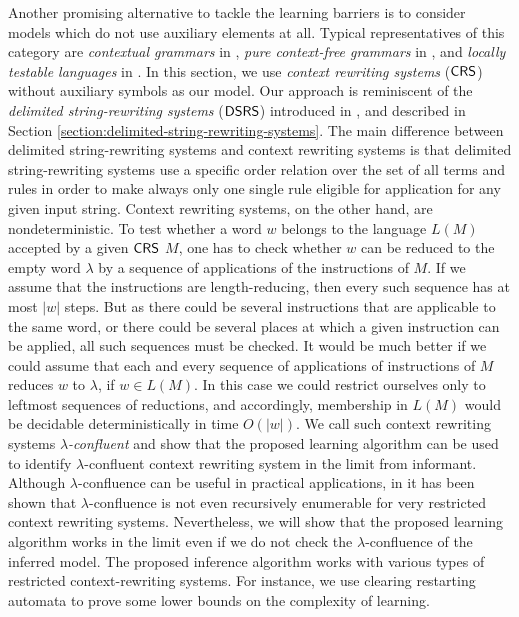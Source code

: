 Another promising alternative to tackle the learning barriers is to consider models which do not use auxiliary elements at all. Typical representatives of this category are \emph{contextual grammars} in \citep{M69}, \emph{pure context-free grammars} in \citep{maurer1980pure}, and \emph{locally testable languages} in \citep{MR74,Zal72}. In this section, we use \emph{context rewriting systems} ($\textup{\sf CRS\/}$) without auxiliary symbols as our model. Our approach is reminiscent of the \emph{delimited string-rewriting systems} ($\textup{\sf DSRS}$) introduced in \citep{Eyraud2007}, and described in Section \ref{section:delimited-string-rewriting-systems}. The main difference between delimited string-rewriting systems and context rewriting systems is that delimited string-rewriting systems use a specific order relation over the set of all terms and rules in order to make always only one single rule eligible for application for any given input string. Context rewriting systems, on the other hand, are nondeterministic. To test whether a word $w$ belongs to the language $L(M)$ accepted by a given $\textup{\sf CRS\/}$ $M$, one has to check whether $w$ can be reduced to the empty word $\lambda$ by a sequence of applications of the instructions of $M$. If we assume that the instructions are length-reducing, then every such sequence has at most $|w|$ steps. But as there could be several instructions that are applicable to the same word, or there could be several places at which a given instruction can be applied, all such sequences must be checked. It would be much better if we could assume that each and every sequence of applications of instructions of $M$ reduces $w$ to $\lambda$, if $w \in L(M)$. In this case we could restrict ourselves only to leftmost sequences of reductions, and accordingly, membership in $L(M)$ would be decidable deterministically in time $O(|w|)$. We call such context rewriting systems \emph{$\lambda$-confluent} and show that the proposed learning algorithm can be used to identify $\lambda$-confluent context rewriting system in the limit from informant. Although $\lambda$-confluence can be useful in practical applications, in \citep{OM15} it has been shown that $\lambda$-confluence is not even recursively enumerable for very restricted context rewriting systems. Nevertheless, we will show that the proposed learning algorithm works in the limit even if we do not check the $\lambda$-confluence of the inferred model. The proposed inference algorithm works with various types of restricted context-rewriting systems. For instance, we use clearing restarting automata to prove some lower bounds on the complexity of learning.

